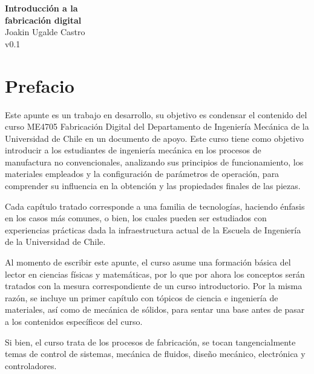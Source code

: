 \documentclass[12pt,letter,oneside]{book}
\numberwithin{equation}{chapter}
\numberwithin{figure}{chapter}
\numberwithin{table}{chapter}
\begin{document}
\begin{titlepage}
    \centering
     \vspace*{\fill}
    {\Huge \textbf{Introducción a la \\[0.5cm] fabricación digital}}\\[0.5cm]
    {\large Joakin Ugalde Castro}\\
    {\large v0.1}\\[4cm]
    \vfill
\end{titlepage}

\tableofcontents

\chapter*{Prefacio}

Este apunte es un trabajo en desarrollo, su objetivo es condensar el contenido del curso ME4705 Fabricación Digital del Departamento de Ingeniería Mecánica de la Universidad de Chile en un documento de apoyo. Este curso tiene como objetivo introducir a los estudiantes de ingeniería mecánica en los procesos de manufactura no convencionales, analizando sus principios de funcionamiento, los materiales empleados y la configuración de parámetros de operación, para comprender su influencia en la obtención y las propiedades finales de las piezas.

Cada capítulo tratado corresponde a una familia de tecnologías, haciendo énfasis en los casos más comunes, o bien, los cuales pueden ser estudiados con experiencias prácticas dada la infraestructura actual de la Escuela de Ingeniería de la Universidad de Chile.

Al momento de escribir este apunte, el curso asume una formación básica del lector en ciencias físicas y matemáticas, por lo que por ahora los conceptos serán tratados con la mesura correspondiente de un curso introductorio. Por la misma razón, se incluye un primer capítulo con tópicos de ciencia e ingeniería de materiales, así como de mecánica de sólidos, para sentar una base antes de pasar a los contenidos específicos del curso.

Si bien, el curso trata de los procesos de fabricación, se tocan tangencialmente temas de control de sistemas, mecánica de fluidos, diseño mecánico, electrónica y controladores.











\backmatter            %


\printbibliography
\end{document}
